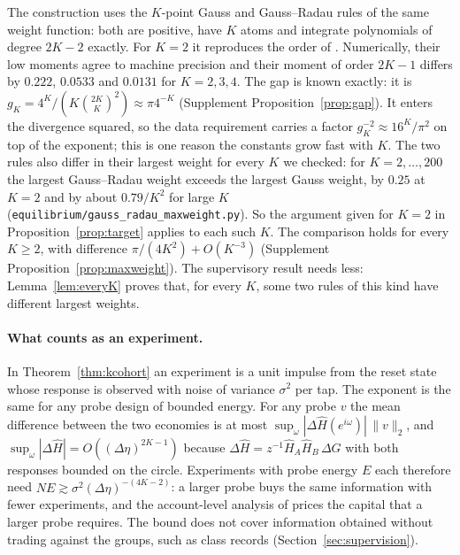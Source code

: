 \documentclass[12pt]{article}
\theoremstyle{definition}
\theoremstyle{remark}
\begin{document}
The construction uses the $K$-point Gauss and Gauss--Radau rules of the same weight function: both are positive, have $K$ atoms and integrate polynomials of degree $2K-2$ exactly. For $K=2$ it reproduces the order of \citet[their Theorem~S11.1]{niroula2026full}. Numerically, their low moments agree to machine precision and their moment of order $2K-1$ differs by $0.222$, $0.0533$ and $0.0131$ for $K=2,3,4$. The gap is known exactly: it is $g_K=4^K/(K\binom{2K}{K}^2)\approx\pi4^{-K}$ (Supplement Proposition~\ref{prop:gap}). It enters the divergence squared, so the data requirement carries a factor $g_K^{-2}\approx16^K/\pi^2$ on top of the exponent; this is one reason the constants grow fast with $K$. The two rules also differ in their largest weight for every $K$ we checked: for $K=2,\ldots,200$ the largest Gauss--Radau weight exceeds the largest Gauss weight, by $0.25$ at $K=2$ and by about $0.79/K^2$ for large $K$ (\nolinkurl{equilibrium/gauss_radau_maxweight.py}). So the argument given for $K=2$ in Proposition~\ref{prop:target} applies to each such $K$. The comparison holds for every $K\ge2$, with difference $\pi/(4K^2)+O(K^{-3})$ (Supplement Proposition~\ref{prop:maxweight}). The supervisory result needs less: Lemma~\ref{lem:everyK} proves that, for every $K$, some two rules of this kind have different largest weights.

\paragraph{What counts as an experiment.} In Theorem~\ref{thm:kcohort} an experiment is a unit impulse from the reset state whose response is observed with noise of variance $\sigma^2$ per tap. The exponent is the same for any probe design of bounded energy. For any probe $v$ the mean difference between the two economies is at most $\sup_\omega|\Delta\hat H(e^{i\omega})|\,\|v\|_2$, and $\sup_\omega|\Delta\hat H|=O((\Delta\eta)^{2K-1})$ because $\Delta\hat H=z^{-1}\hat H_A\hat H_B\,\Delta G$ with both responses bounded on the circle. Experiments with probe energy $E$ each therefore need $NE\gtrsim\sigma^2(\Delta\eta)^{-(4K-2)}$: a larger probe buys the same information with fewer experiments, and the account-level analysis of \citet{niroula2026a} prices the capital that a larger probe requires. The bound does not cover information obtained without trading against the groups, such as class records (Section~\ref{sec:supervision}).
\end{document}
